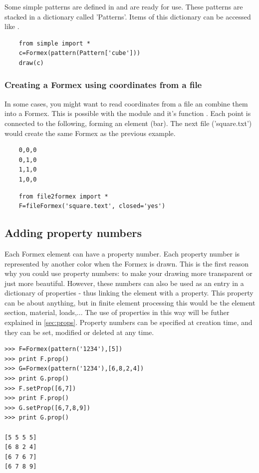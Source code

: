 \documentclass[a4paper]{manual}
\begin{document}
{Some simple patterns are defined in  and are ready for use. These patterns are stacked in a dictionary called 'Patterns'. Items of this dictionary can be accessed like .
\begin{verbatim}
	from simple import *
	c=Formex(pattern(Pattern['cube']))
	draw(c)
\end{verbatim}

\subsubsection{Creating a Formex using coordinates from a file}
In some cases, you might want to read coordinates from a file an combine them into a Formex. This is possible with the module  and it's function . Each point is connected to the following, forming an element (bar).
The next file ('square.txt') would create the same Formex as the previous example. %
\begin{verbatim}
	0,0,0
	0,1,0
	1,1,0
	1,0,0
\end{verbatim}
\begin{verbatim}
	from file2formex import *
	F=fileFormex('square.text', closed='yes')
\end{verbatim}

\subsection{Adding property numbers}
\label{subsec:propnr}
Each Formex element can have a property number. Each property number is represented by another color when the Formex is drawn. This is the first reason why you could use property numbers: to make your drawing more transparent or just more beautiful. However, these numbers can also be used as an entry in a dictionary of properties - thus linking the element with a property. This property can be about anything, but in finite element processing this would be the element section, material, loads,... The use of properties in this way will be futher explained in \ref{sec:props}.
Property numbers can be specified at creation time, and they can be set, modified or deleted at any time.  
\begin{verbatim}
>>> F=Formex(pattern('1234'),[5])
>>> print F.prop()
>>> G=Formex(pattern('1234'),[6,8,2,4])
>>> print G.prop()
>>> F.setProp([6,7])
>>> print F.prop()
>>> G.setProp([6,7,8,9])
>>> print G.prop()

[5 5 5 5]
[6 8 2 4]
[6 7 6 7]
[6 7 8 9]
\end{verbatim}

}
\end{document}
